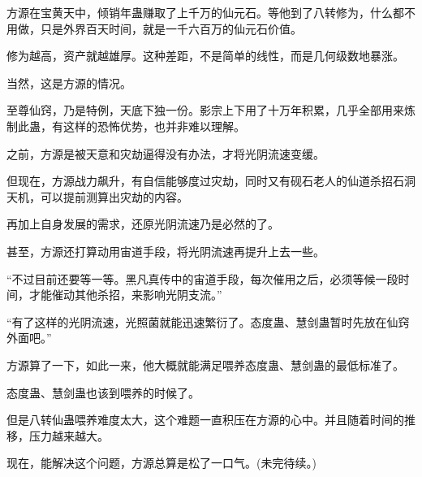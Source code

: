 \begin{this_body}
方源在宝黄天中，倾销年蛊赚取了上千万的仙元石。等他到了八转修为，什么都不用做，只是外界百天时间，就是一千六百万的仙元石价值。

修为越高，资产就越雄厚。这种差距，不是简单的线性，而是几何级数地暴涨。

当然，这是方源的情况。

至尊仙窍，乃是特例，天底下独一份。影宗上下用了十万年积累，几乎全部用来炼制此蛊，有这样的恐怖优势，也并非难以理解。

之前，方源是被天意和灾劫逼得没有办法，才将光阴流速变缓。

但现在，方源战力飙升，有自信能够度过灾劫，同时又有砚石老人的仙道杀招石洞天机，可以提前测算出灾劫的内容。

再加上自身发展的需求，还原光阴流速乃是必然的了。

甚至，方源还打算动用宙道手段，将光阴流速再提升上去一些。

“不过目前还要等一等。黑凡真传中的宙道手段，每次催用之后，必须等候一段时间，才能催动其他杀招，来影响光阴支流。”

“有了这样的光阴流速，光照菌就能迅速繁衍了。态度蛊、慧剑蛊暂时先放在仙窍外面吧。”

方源算了一下，如此一来，他大概就能满足喂养态度蛊、慧剑蛊的最低标准了。

态度蛊、慧剑蛊也该到喂养的时候了。

但是八转仙蛊喂养难度太大，这个难题一直积压在方源的心中。并且随着时间的推移，压力越来越大。

现在，能解决这个问题，方源总算是松了一口气。(未完待续。)

\end{this_body}

